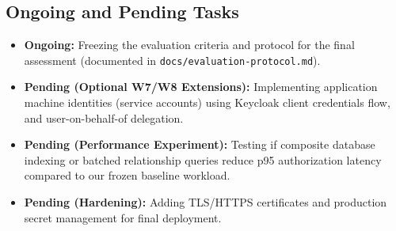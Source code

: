 \documentclass{article}
\begin{document}
\subsection*{Ongoing and Pending Tasks}
\begin{itemize}
    \item \textbf{Ongoing:} Freezing the evaluation criteria and protocol for the final assessment (documented in \texttt{docs/evaluation-protocol.md}).
    \item \textbf{Pending (Optional W7/W8 Extensions):} Implementing application machine identities (service accounts) using Keycloak client credentials flow, and user-on-behalf-of delegation.
    \item \textbf{Pending (Performance Experiment):} Testing if composite database indexing or batched relationship queries reduce p95 authorization latency compared to our frozen baseline workload.
    \item \textbf{Pending (Hardening):} Adding TLS/HTTPS certificates and production secret management for final deployment.
\end{itemize}
\end{document}
